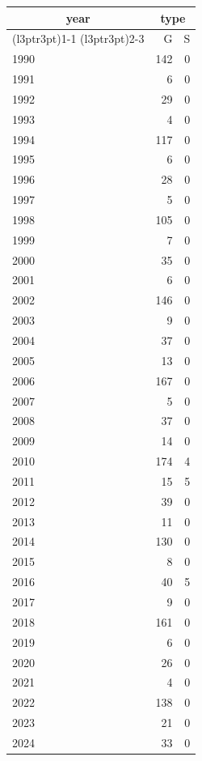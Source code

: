 \footnotesize\begin{tabular}[t]{lrr}
\toprule
\multicolumn{1}{c}{year} & \multicolumn{2}{c}{type} \\
\cmidrule(l{3pt}r{3pt}){1-1} \cmidrule(l{3pt}r{3pt}){2-3}
  & G & S\\
\midrule
1990 & 142 & 0\\
1991 & 6 & 0\\
1992 & 29 & 0\\
1993 & 4 & 0\\
1994 & 117 & 0\\
1995 & 6 & 0\\
1996 & 28 & 0\\
1997 & 5 & 0\\
1998 & 105 & 0\\
1999 & 7 & 0\\
2000 & 35 & 0\\
2001 & 6 & 0\\
2002 & 146 & 0\\
2003 & 9 & 0\\
2004 & 37 & 0\\
2005 & 13 & 0\\
2006 & 167 & 0\\
2007 & 5 & 0\\
2008 & 37 & 0\\
2009 & 14 & 0\\
2010 & 174 & 4\\
2011 & 15 & 5\\
2012 & 39 & 0\\
2013 & 11 & 0\\
2014 & 130 & 0\\
2015 & 8 & 0\\
2016 & 40 & 5\\
2017 & 9 & 0\\
2018 & 161 & 0\\
2019 & 6 & 0\\
2020 & 26 & 0\\
2021 & 4 & 0\\
2022 & 138 & 0\\
2023 & 21 & 0\\
2024 & 33 & 0\\
\bottomrule
\end{tabular}
